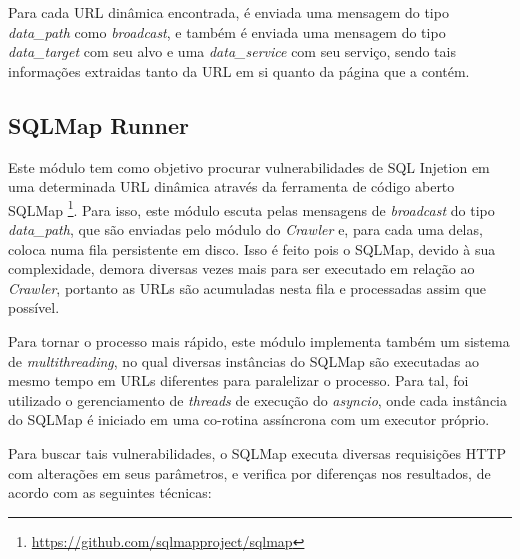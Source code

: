     Para cada URL dinâmica encontrada, é enviada uma mensagem do tipo \textit{data\_path} como \textit{broadcast}, e também é enviada uma mensagem do tipo \textit{data\_target} com seu alvo e uma \textit{data\_service} com seu serviço, sendo tais informações extraidas tanto da URL em si quanto da página que a contém.
    
    \subsection{SQLMap Runner}
    Este módulo tem como objetivo procurar vulnerabilidades de SQL Injetion em uma determinada URL dinâmica através da ferramenta de código aberto SQLMap \footnote{\url{https://github.com/sqlmapproject/sqlmap}}. Para isso, este módulo escuta pelas mensagens de \textit{broadcast} do tipo \textit{data\_path}, que são enviadas pelo módulo do \textit{Crawler} e, para cada uma delas, coloca numa fila persistente em disco. Isso é feito pois o SQLMap, devido à sua complexidade, demora diversas vezes mais para ser executado em relação ao \textit{Crawler}, portanto as URLs são acumuladas nesta fila e processadas assim que possível.
    
    Para tornar o processo mais rápido, este módulo implementa também um sistema de \textit{multithreading}, no qual diversas instâncias do SQLMap são executadas ao mesmo tempo em URLs diferentes para paralelizar o processo. Para tal, foi utilizado o gerenciamento de \textit{threads} de execução do \textit{asyncio}, onde cada instância do SQLMap é iniciado em uma co-rotina assíncrona com um executor próprio.
    
    Para buscar tais vulnerabilidades, o SQLMap executa diversas requisições HTTP com alterações em seus parâmetros, e verifica por diferenças nos resultados, de acordo com as seguintes técnicas:
    
